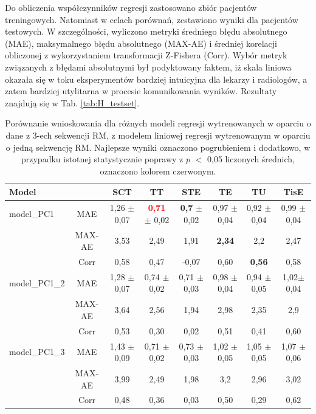 Do obliczenia współczynników regresji zastosowano zbiór pacjentów treningowych. Natomiast w celach porównań, zestawiono wyniki dla pacjentów testowych. \linebreak W szczególności, wyliczono metryki średniego błędu absolutnego (MAE), maksymalnego błędu absolutnego (MAX-AE) i średniej korelacji obliczonej z wykorzystaniem transformacji Z-Fishera (Corr). Wybór metryk związanych z błędami absolutnymi był podyktowany faktem, iż skala liniowa okazała się w toku eksperymentów bardziej intuicyjna dla lekarzy i radiologów, a zatem bardziej utylitarna w procesie komunikowania wyników. Rezultaty znajdują się w Tab. \ref{tab:H_testset}.
\renewcommand{\arraystretch}{1.2}
\begin{table}[h!]
	\caption{Porównanie wnioskowania dla różnych modeli regresji wytrenowanych w oparciu o dane z 3-ech sekwencji RM, z modelem liniowej regresji wytrenowanym w oparciu o jedną sekwencję RM. Najlepsze wyniki oznaczono pogrubieniem i dodatkowo, w przypadku istotnej statystycznie poprawy z $p$ $<$ 0,05 liczonych średnich, oznaczono kolorem czerwonym.}
	\scriptsize
	\begin{center}
		\begin{tabular}{lc||c|c|c|c|c|c}
			\textbf{Model} & & \textbf{SCT} & \textbf{TT} & \textbf{STE} & \textbf{TE} & \textbf{TU} & \textbf{TisE}\\ 
			
			\hline \hline
			model\_PC1 & MAE & 1,26 $\pm$ 0,07 & \textcolor{red}{\textbf{0,71}} $\pm$ 0,02 & \textbf{0,7} $\pm$ 0,02 & 0,97 $\pm$ 0,04 & 0,92 $\pm$ 0,04 & 0,99 $\pm$ 0,04\\
			&MAX-AE &3,53&2,49&1,91&\textbf{2,34}&2,2&2,47\\
			&Corr &0,58&0,47&-0,07&0,60&\textbf{0,56}&0,58\\
			
			\hline
			model\_PC1\_2 & MAE & 1,28 $\pm$ 0,07 & 0,74 $\pm$ 0,02 & 0,71 $\pm$ 0,03 & 0,98 $\pm$ 0,04 & 0,94 $\pm$ 0,05 & 1,02$\pm$ 0,04\\
			&MAX-AE &3,64&2,56&1,94&2,98&2,35&2,9\\
			&Corr &0,53&0,30&0,02&0,51&0,41&0,60\\
			
			\hline
			model\_PC1\_3&MAE & 1,43 $\pm$ 0,09 & 0,71 $\pm$ 0,02 & 0,73 $\pm$ 0,03 & 1,02 $\pm$ 0,05 & 1,05 $\pm$ 0,05 & 1,07 $\pm$ 0,06\\
			&MAX-AE &3,99&2,49&1,98&3,2&2,96&3,02\\
			&Corr &0,48&0,36&0,03&0,50&0,29&0,62\\
			

\end{tabular}
\end{center}
\end{table}
